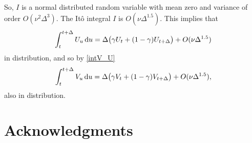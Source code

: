 \documentclass{ws-ijfe}
\begin{document}
So, $I$ is a normal distributed random variable with mean zero and variance of order $O(\nu^2\Delta^{3})$. The It\^o integral $I$ is $O(\nu\Delta^{1.5})$.
This implies that
\begin{equation*}
   \int_{t}^{t+\Delta}U_u\,\mathrm{d} u = \Delta\big(\gamma U_t+(1-\gamma) U_{t+\Delta}\big)+O(\nu\Delta^{1.5})
\end{equation*}
in distribution, and so by \eqref{intV_U}
\begin{equation*}
    \int_{t}^{t+\Delta}V_u\,\mathrm{d} u=\Delta\big(\gamma V_t+(1-\gamma) V_{t+\Delta}\big)+O(\nu\Delta^{1.5}),
\end{equation*}
also in distribution.

\section*{Acknowledgments}

%
%
%
%


\end{document}
